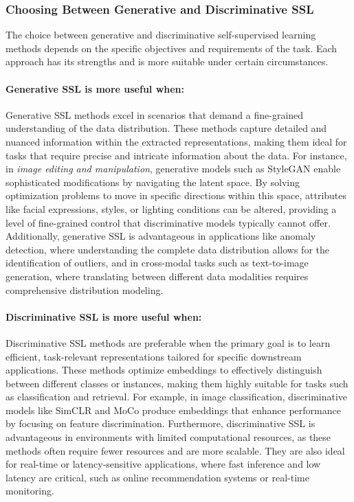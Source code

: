 \subsubsection{Choosing Between Generative and Discriminative SSL}

The choice between generative and discriminative self-supervised learning methods depends on the specific objectives and requirements of the task. Each approach has its strengths and is more suitable under certain circumstances.

\paragraph{Generative SSL is more useful when:}

Generative SSL methods excel in scenarios that demand a fine-grained understanding of the data distribution. These methods capture detailed and nuanced information within the extracted representations, making them ideal for tasks that require precise and intricate information about the data. For instance, in \emph{image editing and manipulation}, generative models such as StyleGAN \citep{karras2019style, karras2020analyzing} enable sophisticated modifications by navigating the latent space. By solving optimization problems to move in specific directions within this space, attributes like facial expressions, styles, or lighting conditions can be altered, providing a level of fine-grained control that discriminative models typically cannot offer. Additionally, generative SSL is advantageous in applications like anomaly detection, where understanding the complete data distribution allows for the identification of outliers, and in cross-modal tasks such as text-to-image generation, where translating between different data modalities requires comprehensive distribution modeling.

\paragraph{Discriminative SSL is more useful when:}

Discriminative SSL methods are preferable when the primary goal is to learn efficient, task-relevant representations tailored for specific downstream applications. These methods optimize embeddings to effectively distinguish between different classes or instances, making them highly suitable for tasks such as classification and retrieval. For example, in image classification, discriminative models like SimCLR \citep{chen2020simple} and MoCo \citep{he2020momentum} produce embeddings that enhance performance by focusing on feature discrimination. Furthermore, discriminative SSL is advantageous in environments with limited computational resources, as these methods often require fewer resources and are more scalable. They are also ideal for real-time or latency-sensitive applications, where fast inference and low latency are critical, such as online recommendation systems or real-time monitoring.

